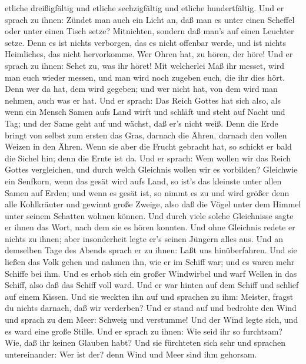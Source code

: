 etliche dreißigfältig und etliche sechzigfältig und etliche
hundertfältig.  Und er sprach zu ihnen: Zündet man auch ein
Licht an, daß man es unter einen Scheffel oder unter einen Tisch setze?
Mitnichten, sondern daß man's auf einen Leuchter setze. 
Denn es ist nichts verborgen, das es nicht offenbar werde, und ist
nichts Heimliches, das nicht hervorkomme.  Wer Ohren hat,
zu hören, der höre!  Und er sprach zu ihnen: Sehet zu, was
ihr höret! Mit welcherlei Maß ihr messet, wird man euch wieder messen,
und man wird noch zugeben euch, die ihr dies hört.  Denn
wer da hat, dem wird gegeben; und wer nicht hat, von dem wird man
nehmen, auch was er hat.  Und er sprach: Das Reich Gottes
hat sich also, als wenn ein Mensch Samen aufs Land wirft 
und schläft und steht auf Nacht und Tag; und der Same geht auf und
wächst, daß er's nicht weiß.  Denn die Erde bringt von
selbst zum ersten das Gras, darnach die Ähren, darnach den vollen Weizen
in den Ähren.  Wenn sie aber die Frucht gebracht hat, so
schickt er bald die Sichel hin; denn die Ernte ist da.  Und
er sprach: Wem wollen wir das Reich Gottes vergleichen, und durch welch
Gleichnis wollen wir es vorbilden?  Gleichwie ein Senfkorn,
wenn das gesät wird aufs Land, so ist's das kleinste unter allen Samen
auf Erden;  und wenn es gesät ist, so nimmt es zu und wird
größer denn alle Kohlkräuter und gewinnt große Zweige, also daß die
Vögel unter dem Himmel unter seinem Schatten wohnen können.
 Und durch viele solche Gleichnisse sagte er ihnen das
Wort, nach dem sie es hören konnten.  Und ohne Gleichnis
redete er nichts zu ihnen; aber insonderheit legte er's seinen Jüngern
alles aus.  Und an demselben Tage des Abends sprach er zu
ihnen: Laßt uns hinüberfahren.  Und sie ließen das Volk
gehen und nahmen ihn, wie er im Schiff war; und es waren mehr Schiffe
bei ihm.  Und es erhob sich ein großer Windwirbel und warf
Wellen in das Schiff, also daß das Schiff voll ward.  Und
er war hinten auf dem Schiff und schlief auf einem Kissen. Und sie
weckten ihn auf und sprachen zu ihm: Meister, fragst du nichts darnach,
daß wir verderben?  Und er stand auf und bedrohte den Wind
und sprach zu dem Meer: Schweig und verstumme! Und der Wind legte sich,
und es ward eine große Stille.  Und er sprach zu ihnen: Wie
seid ihr so furchtsam? Wie, daß ihr keinen Glauben habt? 
Und sie fürchteten sich sehr und sprachen untereinander: Wer ist der?
denn Wind und Meer sind ihm gehorsam.

